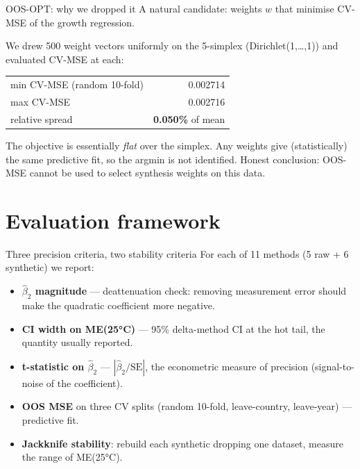 \documentclass[10pt,aspectratio=169]{beamer}
\begin{document}
\begin{frame}{OOS-OPT: why we dropped it}
  A natural candidate: weights $w$ that minimise CV-MSE of the growth regression.
  \vspace{0.3em}

  We drew 500 weight vectors uniformly on the 5-simplex (Dirichlet(1,\ldots,1))
  and evaluated CV-MSE at each:

  \vspace{0.3em}
  \centering
  \small
  \begin{tabular}{l r}
    \toprule
    min CV-MSE (random 10-fold) & 0.002714 \\
    max CV-MSE                  & 0.002716 \\
    relative spread             & \textbf{0.050\%} of mean \\
    \bottomrule
  \end{tabular}

  \vspace{0.6em}
  \footnotesize
  The objective is essentially \emph{flat} over the simplex.  Any weights
  give (statistically) the same predictive fit, so the argmin is not
  identified. Honest conclusion: OOS-MSE cannot be used to select synthesis
  weights on this data.
\end{frame}

\section{Evaluation framework}

\begin{frame}{Three precision criteria, two stability criteria}
  For each of 11 methods (5 raw + 6 synthetic) we report:

  \vspace{0.4em}
  \small
  \begin{itemize}
    \item \textbf{$\hat\beta_2$ magnitude} --- deattenuation check: removing
          measurement error should make the quadratic coefficient more
          negative.
    \item \textbf{CI width on ME(25°C)} --- 95\% delta-method CI at the hot
          tail, the quantity usually reported.
    \item \textbf{t-statistic on $\hat\beta_2$} --- $|\hat\beta_2/\text{SE}|$,
          the econometric measure of precision (signal-to-noise of the
          coefficient).
    \item \textbf{OOS MSE} on three CV splits (random 10-fold, leave-country,
          leave-year) --- predictive fit.
    \item \textbf{Jackknife stability}: rebuild each synthetic dropping one
          dataset, measure the range of ME(25°C).
  \end{itemize}
\end{frame}
\end{document}
